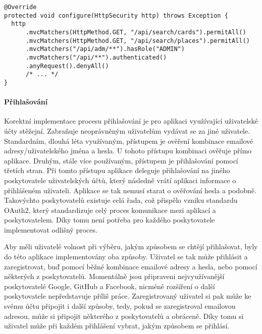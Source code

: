 			\begin{codeblock}
				\begin{verbatim}
@Override
protected void configure(HttpSecurity http) throws Exception {
  http
      .mvcMatchers(HttpMethod.GET, "/api/search/cards").permitAll()
      .mvcMatchers(HttpMethod.GET, "/api/search/places").permitAll()
      .mvcMatchers("/api/adm/**").hasRole("ADMIN")
      .mvcMatchers("/api/**").authenticated()
      .anyRequest().denyAll()
      /* ... */
}
				\end{verbatim}
			\end{codeblock}

			\paragraph{Přihlašování}

			Korektní implementace procesu přihlašování je pro aplikaci využívající uživatelské účty stěžejní.
			Zabraňuje neoprávněným uživatelům vydávat se za jiné uživatele.
			Standardním, dlouhá léta využívaným, přístupem je ověření kombinace emailové adresy/uživatelského jména
			a hesla.
			U tohoto přístupu kombinaci ověřuje přímo aplikace.
			Druhým, stále více používaným, přístupem je přihlašování pomocí třetích stran.
			Při tomto přístupu aplikace deleguje přihlašování na jiného poskytovatele uživatelských účtů, který následně
			vrátí aplikaci informace o přihlášeném uživateli.
			Aplikace se tak nemusí starat o ověřování hesla a podobně.
			Takovýchto poskytovatelů existuje celá řada, což přispělo vzniku standardu OAuth2, který standardizuje celý proces
			komunikace mezi aplikací a poskytovatelem.
			Díky tomu není potřeba pro každého poskytovatele implementovat odlišný proces.

			Aby měli uživatelé volnost při výběru, jakým způsobem se chtějí přihlašovat, byly do této aplikace implementovány
			oba způsoby.
			Uživatel se tak může přihlásit a zaregistrovat, buď pomocí běžné kombinace emailové adresy a hesla, nebo pomocí
			některých z poskytovatelů.
			Momentálně jsou připraveni nejvyužívanější poskytovatelé Google, GitHub a Facebook, nicméně rozšíření o
			další poskytovatele nepředstavuje příliš práce.
			Zaregistrovaný uživatel si pak může ke svému účtu připojit i další způsoby, tedy, pokud se zaregistroval emailovou
			adresou, může si připojit některého z poskytovatelů a obráceně.
			Díky tomu si uživatel může při každém přihlášení vybrat, jakým způsobem se přihlásí.

